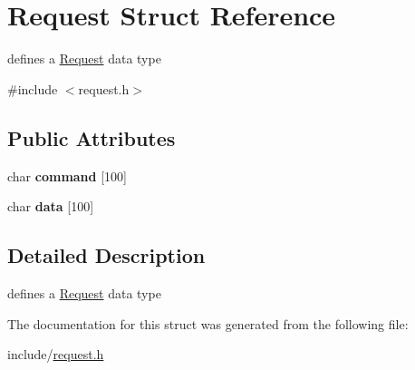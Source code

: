 \hypertarget{structRequest}{}\section{Request Struct Reference}
\label{structRequest}


defines a \hyperlink{structRequest}{Request} data type  




{\ttfamily \#include $<$request.\+h$>$}

\subsection*{Public Attributes}
\begin{DoxyCompactItemize}
\item 
char {\bfseries command} \mbox{[}100\mbox{]}\hypertarget{structRequest_ab89e3bcf634e4dfe1a1fc7b4397114c0}{}\label{structRequest_ab89e3bcf634e4dfe1a1fc7b4397114c0}

\item 
char {\bfseries data} \mbox{[}100\mbox{]}\hypertarget{structRequest_a2a47f13762766a469a1eb5a1489daf41}{}\label{structRequest_a2a47f13762766a469a1eb5a1489daf41}

\end{DoxyCompactItemize}


\subsection{Detailed Description}
defines a \hyperlink{structRequest}{Request} data type 

The documentation for this struct was generated from the following file\+:\begin{DoxyCompactItemize}
\item 
include/\hyperlink{request_8h}{request.\+h}\end{DoxyCompactItemize}
